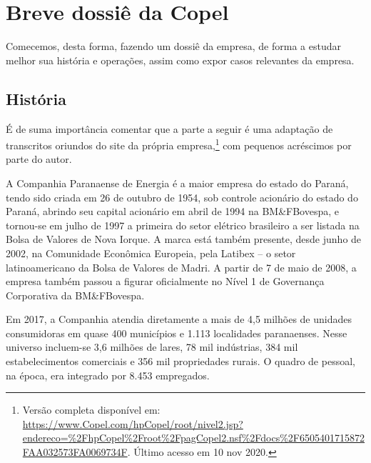 \documentclass[grad,numbers]{coppe}
\begin{document}
  \hypertarget{breve-dossiuxea-da-copel}{%
  \section{Breve dossiê da Copel}\label{breve-dossiuxea-da-copel}}

  Comecemos, desta forma, fazendo um dossiê da empresa, de forma a estudar melhor sua história e operações, assim como expor casos relevantes da empresa.

  \hypertarget{histuxf3ria}{%
  \subsection{História}\label{histuxf3ria}}

  É de suma importância comentar que a parte a seguir é uma adaptação de transcritos oriundos do site da própria empresa,\footnote{Versão completa disponível em: \url{https://www.Copel.com/hpCopel/root/nivel2.jsp?endereco=\%2FhpCopel\%2Froot\%2FpagCopel2.nsf\%2Fdocs\%2F6505401715872FAA032573FA0069734F}. Último acesso em 10 nov 2020.} com pequenos acréscimos por parte do autor.

  A Companhia Paranaense de Energia é a maior empresa do estado do Paraná, tendo sido criada em 26 de outubro de 1954, sob controle acionário do estado do Paraná, abrindo seu capital acionário em abril de 1994 na BM\&FBovespa, e tornou-se em julho de 1997 a primeira do setor elétrico brasileiro a ser listada na Bolsa de Valores de Nova Iorque. A marca está também presente, desde junho de 2002, na Comunidade Econômica Europeia, pela Latibex -- o setor latinoamericano da Bolsa de Valores de Madri. A partir de 7 de maio de 2008, a empresa também passou a figurar oficialmente no Nível 1 de Governança Corporativa da BM\&FBovespa.

  Em 2017, a Companhia atendia diretamente a mais de 4,5 milhões de unidades consumidoras em quase 400 municípios e 1.113 localidades paranaenses. Nesse universo incluem-se 3,6 milhões de lares, 78 mil indústrias, 384 mil estabelecimentos comerciais e 356 mil propriedades rurais. O quadro de pessoal, na época, era integrado por 8.453 empregados.
\end{document}
